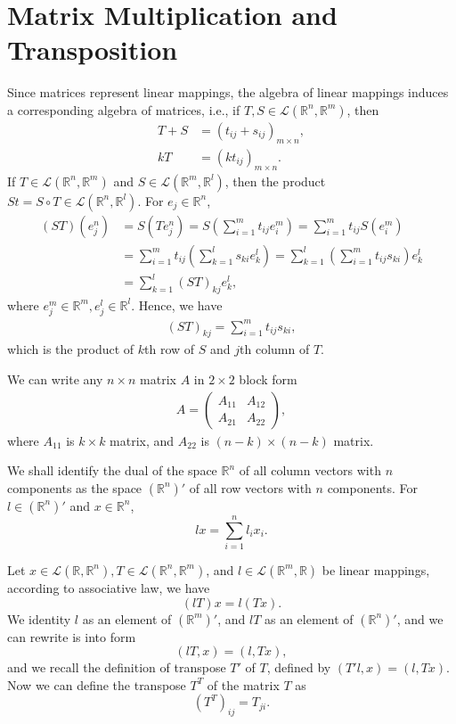 \documentclass[11pt]{book}
\theoremstyle{definition}
\numberwithin{equation}{chapter}
\begin{document}
\section{Matrix Multiplication and Transposition}
Since matrices represent linear mappings, the algebra of linear mappings induces a corresponding algebra of matrices, i.e., if $T,S\in \mathscr{L}(\mathbb{R}^n,\mathbb{R}^m)$, then
\begin{align*}
    T+S &= (t_{ij} + s_{ij})_{m\times n},\\
    k T &= (kt_{ij})_{m\times n}.
\end{align*}
If $T\in \mathscr{L}(\mathbb{R}^n,\mathbb{R}^m)$ and $S\in \mathscr{L}(\mathbb{R}^m,\mathbb{R}^l)$, then the product $St = S\circ T \in \mathscr{L}(\mathbb{R}^n,\mathbb{R}^l)$. For $e_j\in\mathbb{R}^n$,
\begin{align*}
    (ST)(e_j^n) & = S(Te_j^n) = S\left(\sum^m_{i=1}t_{ij}e^m_i\right) = \sum^m_{i=1}t_{ij} S(e^m_i) \\
    & = \sum^m_{i=1}t_{ij} \left(\sum^l_{k=1}s_{ki}e^l_k\right) = \sum^l_{k=1}\left(\sum^m_{i=1}t_{ij}s_{ki}\right)e^l_k \\
    & = \sum^l_{k=1}(ST)_{kj} e^l_k,
\end{align*}
where $e_j^m\in\mathbb{R}^m,e_j^l\in\mathbb{R}^l$. Hence, we have 
\begin{align*}
    (ST)_{kj} = \sum^m_{i=1}t_{ij}s_{ki},
\end{align*}
which is the product of $k$th row of $S$ and $j$th column of $T$.

We can write any $n\times n$ matrix $A$ in $2\times 2$ block form
\begin{align*}
    A = \left(
        \begin{matrix}
        A_{11} & A_{12} \\
        A_{21} & A_{22} 
        \end{matrix}
    \right),
\end{align*}
where $A_{11}$ is $k\times k$ matrix, and $A_{22}$ is $(n-k)\times(n-k)$ matrix. 

We shall identify the dual of the space $\mathbb{R}^n$ of all column vectors with $n$ components as the space $(\mathbb{R}^n)'$ of all row vectors with $n$ components. For $l\in (\mathbb{R}^n)'$ and $x\in\mathbb{R}^n$, 
$$l x = \sum^n_{i=1}l_ix_i.$$

Let $x\in\mathscr{L}(\mathbb{R},\mathbb{R}^n), T \in \mathscr{L}(\mathbb{R}^n,\mathbb{R}^m)$, and $l \in \mathscr{L}(\mathbb{R}^m,\mathbb{R})$ be linear mappings, according to associative law, we have
$$(lT)x = l(Tx).$$
We identity $l$ as an element of $(\mathbb{R}^m)'$, and $lT$ as an element of $(\mathbb{R}^n)'$, and we can rewrite is into form
$$(lT, x) = (l, Tx),$$
and we recall the definition of transpose $T'$ of $T$, defined by $(T'l, x) = (l, Tx)$. Now we can define the transpose $T^T$ of the matrix $T$ as 
$$\left(T^T\right)_{ij} = T_{ji}.$$
\end{document}
